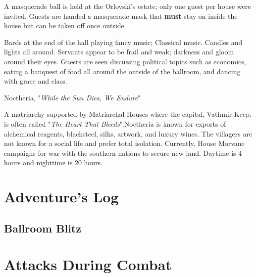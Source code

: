\documentclass[letterpaper,twocolumn,openany,nodeprecatedcode]{dndbook}
\begin{document}

	A masquerade ball is held at the Orlovski's estate; only one guest per house were invited. Guests are handed a masquerade mask that \textbf{must} stay on inside the house but can be taken off once outside.
	
	Bards at the end of the hall playing fancy music; Classical music. Candles and lights all around. Servants appear to be frail and weak; darkness and gloom around their eyes. Guests are seen discussing political topics such as economics, eating a banquest of food all around the outside of the ballroom, and dancing with grace and class.
	
\begin{DndSidebar}[float=!b]{Noctheria, "\textit{While the Sun Dies, We Endure}"}

	A matriarchy supported by Matriarchal Houses where the capital, Vathmir Keep, is often called "\textit{The Heart That Bleeds}".Noctheria is known for exports of alchemical reagents, blacksteel, silks, artwork, and luxury wines. The villagers are not known for a social life and prefer total isolation. Currently, House Morvane campaigns for war with the southern nations to secure new land. Daytime is 4 hours and nighttime is 20 hours.
\end{DndSidebar}


\part{Adventure's Log}
\chapter{Ballroom Blitz}


\part{Attacks During Combat}



%


%
\end{document}
